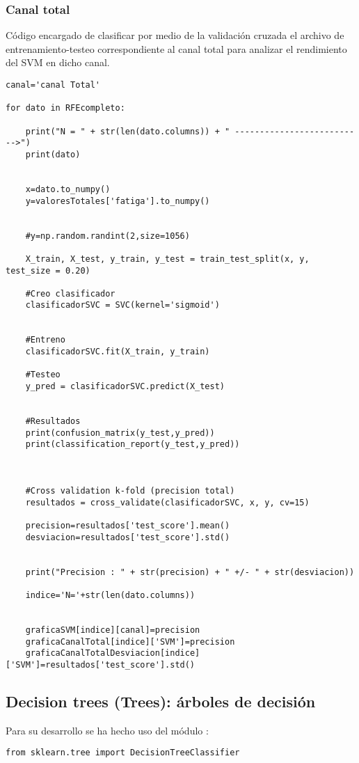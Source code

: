 \subsubsection{Canal total}
Código encargado de clasificar por medio de la validación cruzada el archivo de entrenamiento-testeo correspondiente al canal total para analizar el rendimiento del SVM en dicho canal.
\begin{lstlisting}
canal='canal Total'

for dato in RFEcompleto:
    
    print("N = " + str(len(dato.columns)) + " -------------------------->")
    print(dato)
    
    
    x=dato.to_numpy()
    y=valoresTotales['fatiga'].to_numpy()

    
    #y=np.random.randint(2,size=1056)
    
    X_train, X_test, y_train, y_test = train_test_split(x, y, test_size = 0.20)
    
    #Creo clasificador
    clasificadorSVC = SVC(kernel='sigmoid')


    #Entreno
    clasificadorSVC.fit(X_train, y_train)

    #Testeo 
    y_pred = clasificadorSVC.predict(X_test)


    #Resultados
    print(confusion_matrix(y_test,y_pred))
    print(classification_report(y_test,y_pred))



    #Cross validation k-fold (precision total)
    resultados = cross_validate(clasificadorSVC, x, y, cv=15)
    
    precision=resultados['test_score'].mean()
    desviacion=resultados['test_score'].std()
    
    
    print("Precision : " + str(precision) + " +/- " + str(desviacion))
    
    indice='N='+str(len(dato.columns))

    
    graficaSVM[indice][canal]=precision
    graficaCanalTotal[indice]['SVM']=precision
    graficaCanalTotalDesviacion[indice]['SVM']=resultados['test_score'].std()
\end{lstlisting}

\subsection{Decision trees (Trees): árboles de decisión}
Para su desarrollo se ha hecho uso del módulo \cite{scikitTree}:
\begin{lstlisting}
from sklearn.tree import DecisionTreeClassifier
\end{lstlisting}

